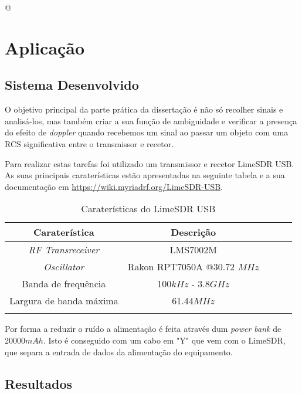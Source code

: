 @%

\chapter{Aplicação} %
\label{chap:Chapter5} %

\section{Sistema Desenvolvido}
O objetivo principal da parte prática da dissertação é não só recolher sinais e analisá-los, mas também criar a sua função de ambiguidade e verificar a presença do efeito de \textit{doppler} quando recebemos um sinal ao passar um objeto com uma \gls{RCS} significativa entre o transmissor e recetor.\par 
Para realizar estas tarefas foi utilizado um transmissor e recetor LimeSDR USB. As suas principais caraterísticas estão apresentadas na seguinte tabela e a sua documentação em \url{https://wiki.myriadrf.org/LimeSDR-USB}.\par

\begin{table}[h]
\centering
\begin{tabular}{@{}ccccc@{}}
\toprule
Caraterística       			 & Descrição                      \\ \midrule
\textit{RF Transreceiver}        & LMS7002M                       \\
\textit{Oscillator}    			 & Rakon RPT7050A @30.72 $MHz$    \\
Banda de frequência              & 100$kHz$ - 3.8$GHz$            \\ 
Largura de banda máxima          & 61.44$MHz$                     \\ \bottomrule
\label{tab:limesdr}
\end{tabular}
\caption[Caraterísticas do LimeSDR USB]{Caraterísticas do LimeSDR USB}
\end{table}

Por forma a reduzir o ruído a alimentação é feita através dum \textit{power bank} de 20000$mAh$. Isto é conseguido com um cabo em "Y" que vem com o LimeSDR, que separa a entrada de dados da alimentação do equipamento.





\section{Resultados}


